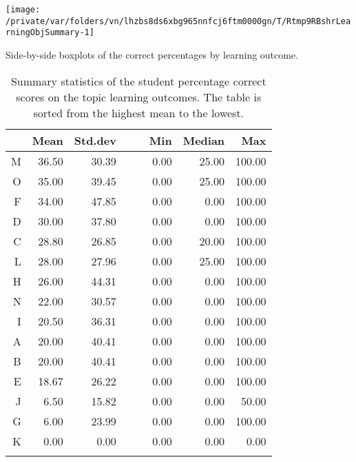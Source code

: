 \documentclass[12pt,english,nohyper]{tufte-handout}\usepackage[]{graphicx}\usepackage[]{color}
\newenvironment{knitrout}{}{} %
\begin{document}
\begin{knitrout}
\color{fgcolor}\begin{marginfigure}
\texttt{[image: /private/var/folders/vn/lhzbs8ds6xbg965nnfcj6ftm0000gn/T/Rtmp9RBshrLearningObjSummary-1]} \caption[Side-by-side boxplots of the correct percentages by learning outcome]{Side-by-side boxplots of the correct percentages by learning outcome.}\label{mar:LearningObjSummary}
\end{marginfigure}


\end{knitrout}

\begin{longtable}{rrrllrrr}
  \hline
 & Mean & Std.dev &   &   & Min & Median & Max \\ 
  \hline
M & 36.50 & 30.39 &  &  & 0.00 & 25.00 & 100.00 \\ 
  O & 35.00 & 39.45 &  &  & 0.00 & 25.00 & 100.00 \\ 
  F & 34.00 & 47.85 &  &  & 0.00 & 0.00 & 100.00 \\ 
  D & 30.00 & 37.80 &  &  & 0.00 & 0.00 & 100.00 \\ 
  C & 28.80 & 26.85 &  &  & 0.00 & 20.00 & 100.00 \\ 
  L & 28.00 & 27.96 &  &  & 0.00 & 25.00 & 100.00 \\ 
  H & 26.00 & 44.31 &  &  & 0.00 & 0.00 & 100.00 \\ 
  N & 22.00 & 30.57 &  &  & 0.00 & 0.00 & 100.00 \\ 
  I & 20.50 & 36.31 &  &  & 0.00 & 0.00 & 100.00 \\ 
  A & 20.00 & 40.41 &  &  & 0.00 & 0.00 & 100.00 \\ 
  B & 20.00 & 40.41 &  &  & 0.00 & 0.00 & 100.00 \\ 
  E & 18.67 & 26.22 &  &  & 0.00 & 0.00 & 100.00 \\ 
  J & 6.50 & 15.82 &  &  & 0.00 & 0.00 & 50.00 \\ 
  G & 6.00 & 23.99 &  &  & 0.00 & 0.00 & 100.00 \\ 
  K & 0.00 & 0.00 &  &  & 0.00 & 0.00 & 0.00 \\ 
   \hline
\hline
\caption{Summary statistics of the student percentage correct scores on the topic learning outcomes. The table is sorted from the highest mean to the lowest.} 
\label{tab:LearningObj_summary}
\end{longtable}
\end{document}
